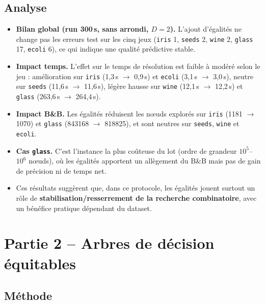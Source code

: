\documentclass[a4paper,10pt,titlepage,leqno]{article}
\begin{document}
\subsection{Analyse}

\begin{resultbox}
\begin{itemize}
  \item \textbf{Bilan global (run 300\,s, sans arrondi, $D=2$).} L'ajout d'égalités ne change pas les erreurs test sur les cinq jeux (\texttt{iris} 1, \texttt{seeds} 2, \texttt{wine} 2, \texttt{glass} 17, \texttt{ecoli} 6), ce qui indique une qualité prédictive stable.
  \item \textbf{Impact temps.} L'effet sur le temps de résolution est faible à modéré selon le jeu : amélioration sur \texttt{iris} (1{,}3\,s $\to$ 0{,}9\,s) et \texttt{ecoli} (3{,}1\,s $\to$ 3{,}0\,s), neutre sur \texttt{seeds} (11{,}6\,s $\to$ 11{,}6\,s), légère hausse sur \texttt{wine} (12{,}1\,s $\to$ 12{,}2\,s) et \texttt{glass} (263{,}6\,s $\to$ 264{,}4\,s).
  \item \textbf{Impact B\&B.} Les égalités réduisent les nœuds explorés sur \texttt{iris} (1181 $\to$ 1070) et \texttt{glass} (843168 $\to$ 818825), et sont neutres sur \texttt{seeds}, \texttt{wine} et \texttt{ecoli}.
  \item \textbf{Cas \texttt{glass}.} C'est l'instance la plus coûteuse du lot (ordre de grandeur $10^5$--$10^6$ nœuds), où les égalités apportent un allègement du B\&B mais pas de gain de précision ni de temps net.
  \item Ces résultats suggèrent que, dans ce protocole, les égalités jouent surtout un rôle de \textbf{stabilisation/resserrement de la recherche combinatoire}, avec un bénéfice pratique dépendant du dataset.
\end{itemize}
\end{resultbox}

\section{Partie 2 -- Arbres de décision équitables}
\label{sec:part2}

\subsection{Méthode}
\end{document}

